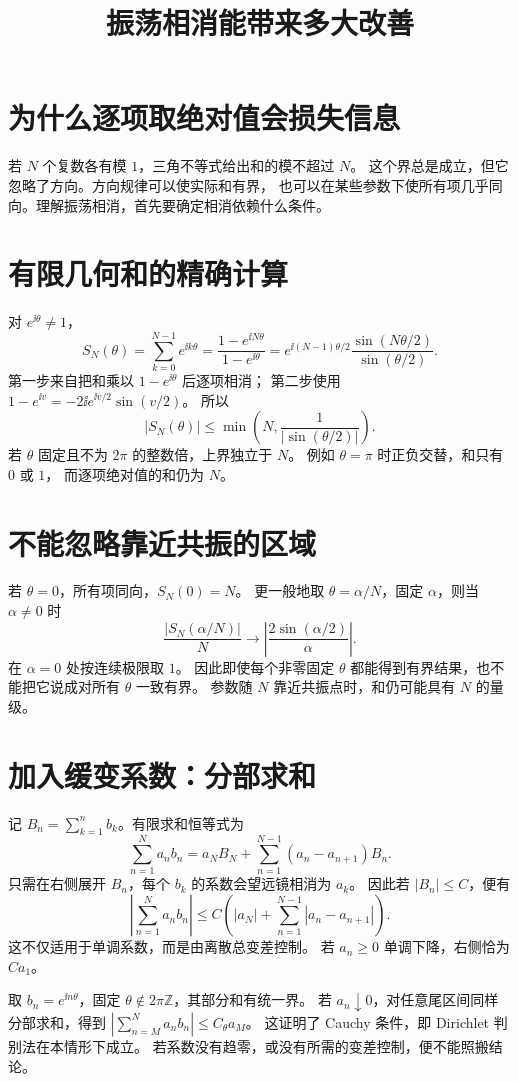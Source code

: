 \documentclass[UTF8,fontset=fandol,11pt]{ctexart}
\title{振荡相消能带来多大改善}
\begin{document}
\maketitle
\draftnotice
\section{为什么逐项取绝对值会损失信息}
若 $N$ 个复数各有模 $1$，三角不等式给出和的模不超过 $N$。
这个界总是成立，但它忽略了方向。方向规律可以使实际和有界，
也可以在某些参数下使所有项几乎同向。理解振荡相消，首先要确定相消依赖什么条件。

\section{有限几何和的精确计算}
对 $e^{\ii\theta}\ne1$，
\[
 S_N(\theta)=\sum_{k=0}^{N-1}e^{\ii k\theta}
 =\frac{1-e^{\ii N\theta}}{1-e^{\ii\theta}}
 =e^{\ii(N-1)\theta/2}
   \frac{\sin(N\theta/2)}{\sin(\theta/2)}.
\]
第一步来自把和乘以 $1-e^{\ii\theta}$ 后逐项相消；
第二步使用 $1-e^{\ii v}=-2\ii e^{\ii v/2}\sin(v/2)$。
所以
\[
 |S_N(\theta)|\le
 \min\left(N,\frac1{|\sin(\theta/2)|}\right).
\]
若 $\theta$ 固定且不为 $2\pi$ 的整数倍，上界独立于 $N$。
例如 $\theta=\pi$ 时正负交替，和只有 $0$ 或 $1$，
而逐项绝对值的和仍为 $N$。

\section{不能忽略靠近共振的区域}
若 $\theta=0$，所有项同向，$S_N(0)=N$。
更一般地取 $\theta=\alpha/N$，固定 $\alpha$，则当 $\alpha\ne0$ 时
\[
 \frac{|S_N(\alpha/N)|}{N}
 \longrightarrow\left|\frac{2\sin(\alpha/2)}{\alpha}\right|.
\]
在 $\alpha=0$ 处按连续极限取 $1$。
因此即使每个非零固定 $\theta$ 都能得到有界结果，也不能把它说成对所有 $\theta$ 一致有界。
参数随 $N$ 靠近共振点时，和仍可能具有 $N$ 的量级。

\section{加入缓变系数：分部求和}
记 $B_n=\sum_{k=1}^n b_k$。有限求和恒等式为
\[
 \sum_{n=1}^Na_nb_n=a_NB_N+
 \sum_{n=1}^{N-1}(a_n-a_{n+1})B_n.
\]
只需在右侧展开 $B_n$，每个 $b_k$ 的系数会望远镜相消为 $a_k$。
因此若 $|B_n|\le C$，便有
\[
 \left|\sum_{n=1}^Na_nb_n\right|
 \le C\left(|a_N|+\sum_{n=1}^{N-1}|a_n-a_{n+1}|\right).
\]
这不仅适用于单调系数，而是由离散总变差控制。
若 $a_n\ge0$ 单调下降，右侧恰为 $Ca_1$。

取 $b_n=e^{\ii n\theta}$，固定 $\theta\notin2\pi\mathbb Z$，其部分和有统一界。
若 $a_n\downarrow0$，对任意尾区间同样分部求和，得到
$\left|\sum_{n=M}^Na_nb_n\right|\le C_\theta a_M$。
这证明了 Cauchy 条件，即 Dirichlet 判别法在本情形下成立。
若系数没有趋零，或没有所需的变差控制，便不能照搬结论。
\end{document}
